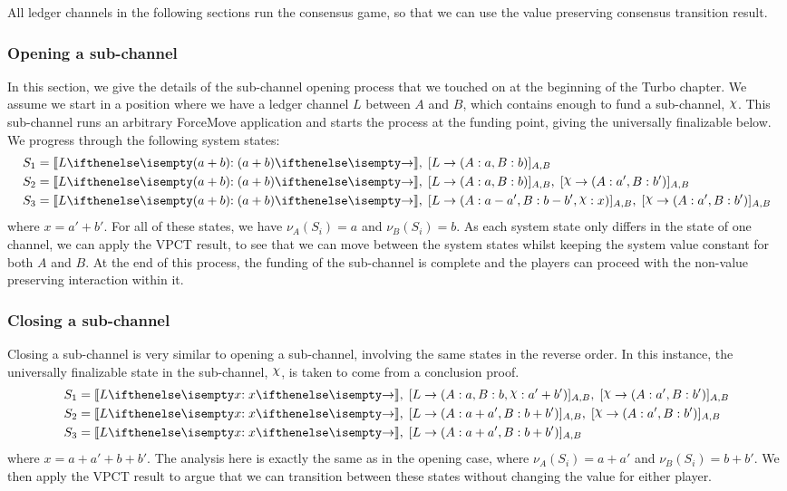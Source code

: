 \documentclass{article}
\begin{document}
All ledger channels in the following sections run the consensus game, so that we can use the value preserving consensus transition result.

\subsubsection{Opening a sub-channel}

In this section, we give the details of the sub-channel opening process that we touched on at the beginning of the Turbo chapter.
We assume we start in a position where we have a ledger channel $L$ between $A$ and $B$, which contains enough to fund a sub-channel, $\rchi$.
This sub-channel runs an arbitrary ForceMove application and starts the process at the funding point, giving the universally finalizable below.
We progress through the following system states:
\begin{align*}
  S_1 &= \adj{\holds{L}{(a+b)}{}},\; \finalizable{L}{\alloc{A:a, B:b}}{A,B}\\
  S_2 &= \adj{\holds{L}{(a+b)}{}},\; \finalizable{L}{\alloc{A:a, B:b}}{A,B},\;  \finalizable{\rchi}{\alloc{A: a', B: b'}}{A,B} \\
  S_3 &= \adj{\holds{L}{(a+b)}{}},\; \finalizable{L}{\alloc{A: a-a', B: b-b', \rchi: x }}{A,B},\; \finalizable{\rchi}{\alloc{A: a', B: b' }}{A, B}
\end{align*}
where $x = a' + b'$.
For all of these states, we have $\nu_A(S_i) = a$ and $\nu_B(S_i) = b$.
As each system state only differs in the state of one channel, we can apply the VPCT result, to see that we can move between the system states whilst keeping the system value constant for both $A$ and $B$.
At the end of this process, the funding of the sub-channel is complete and the players can proceed with the non-value preserving interaction within it.

\subsubsection{Closing a sub-channel}

Closing a sub-channel is very similar to opening a sub-channel, involving the same states in the reverse order.
In this instance, the universally finalizable state in the sub-channel, $\rchi$, is
taken to come from a conclusion proof.
\begin{align*}
S_1 &= \adj{\holds{L}{x}{}},\; \finalizable{L}{\alloc{A: a, B: b, \rchi: a' + b'}}{A, B}, \; \finalizable{\rchi}{\alloc{A: a', B: b'}}{A, B} \\
S_2 &= \adj{\holds{L}{x}{}}, \; \finalizable{L}{\alloc{A: a + a', B: b + b'}}{A, B}, \; \finalizable{\rchi}{\alloc{A: a', B: b'}}{A, B} \\
S_3 &= \adj{\holds{L}{x}{}}, \; \finalizable{L}{\alloc{A: a + a', B: b + b'}}{A, B}
\end{align*}
where $x = a + a' + b + b'$.
The analysis here is exactly the same as in the opening case, where $\nu_A(S_i) = a + a'$ and $\nu_B(S_i) = b + b'$.
We then apply the VPCT result to argue that we can transition between these states without changing the value for either player.
\end{document}
